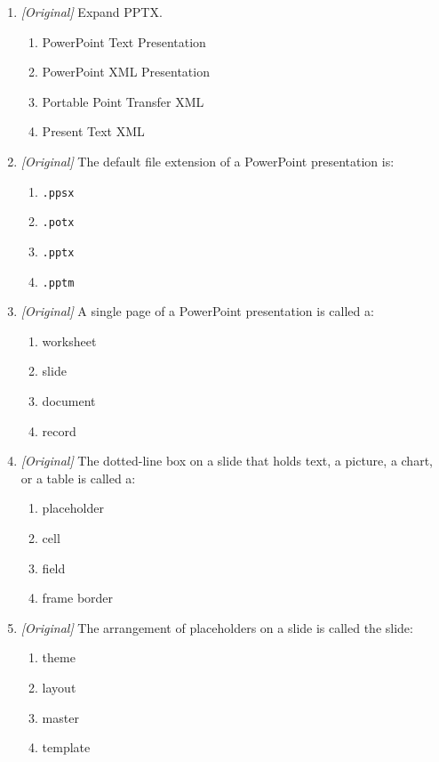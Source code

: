 \begin{enumerate}[label=\textbf{Q\arabic*.}, leftmargin=*]
\item \textit{[Original]} Expand PPTX.
  \begin{enumerate}[label=\Alph*.]
    \item PowerPoint Text Presentation
    \item PowerPoint XML Presentation
    \item Portable Point Transfer XML
    \item Present Text XML
  \end{enumerate}
\item \textit{[Original]} The default file extension of a PowerPoint
  presentation is:
  \begin{enumerate}[label=\Alph*.]
    \item \texttt{.ppsx}
    \item \texttt{.potx}
    \item \texttt{.pptx}
    \item \texttt{.pptm}
  \end{enumerate}
\item \textit{[Original]} A single page of a PowerPoint presentation is
  called a:
  \begin{enumerate}[label=\Alph*.]
    \item worksheet
    \item slide
    \item document
    \item record
  \end{enumerate}
\item \textit{[Original]} The dotted-line box on a slide that holds text, a
  picture, a chart, or a table is called a:
  \begin{enumerate}[label=\Alph*.]
    \item placeholder
    \item cell
    \item field
    \item frame border
  \end{enumerate}
\item \textit{[Original]} The arrangement of placeholders on a slide is
  called the slide:
  \begin{enumerate}[label=\Alph*.]
    \item theme
    \item layout
    \item master
    \item template
  \end{enumerate}

\end{enumerate}
